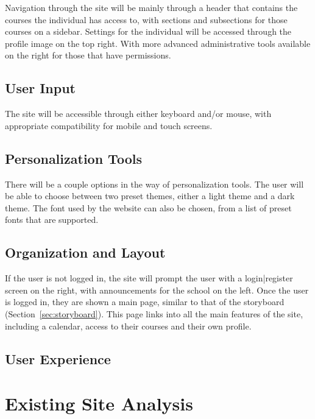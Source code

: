 \documentclass[12pt]{article}
\begin{document}
    Navigation through the site will be mainly through a header that contains the courses the individual has access to, with sections and subsections for those courses on a sidebar.
    Settings for the individual will be accessed through the profile image on the top right.
    With more advanced administrative tools available on the right for those that have permissions.

    \subsection{User Input}\label{subsec:user-input}

    The site will be accessible through either keyboard and/or mouse, with appropriate compatibility for mobile and touch screens.

    \subsection{Personalization Tools}\label{subsec:personalization-tools}

    There will be a couple options in the way of personalization tools.
    The user will be able to choose between two preset themes, either a light theme and a dark theme.
    The font used by the website can also be chosen, from a list of preset fonts that are supported.

    \subsection{Organization and Layout}\label{subsec:organization-and-layout}

    If the user is not logged in, the site will prompt the user with a login|register screen on the right, with announcements for the school on the left.
    Once the user is logged in, they are shown a main page, similar to that of the storyboard (Section\ \ref{sec:storyboard}).
    This page links into all the main features of the site, including a calendar, access to their courses and their own profile.

    \subsection{User Experience}\label{subsec:user-experience}



    \section{Existing Site Analysis}\label{sec:existing-site-analysis}
\end{document}
